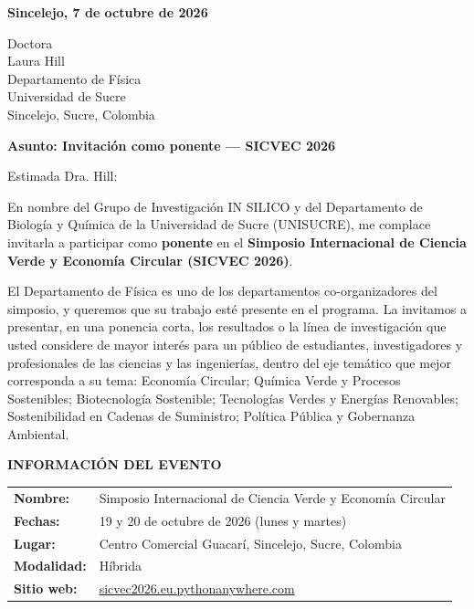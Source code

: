 \documentclass[11pt,a4paper]{article}
\begin{document}
\vspace{0.1cm}

\noindent
\textbf{Sincelejo, 7 de octubre de 2026}

\vspace{0.15cm}

\noindent
Doctora\\
Laura Hill\\
Departamento de Física\\
Universidad de Sucre\\
Sincelejo, Sucre, Colombia

\vspace{0.15cm}

\noindent
\textbf{\large Asunto: Invitación como ponente — SICVEC 2026}

\vspace{0.15cm}

Estimada Dra. Hill:

\vspace{0.1cm}

En nombre del Grupo de Investigación IN SILICO y del Departamento de Biología y Química de la Universidad de Sucre (UNISUCRE), me complace invitarla a participar como \textbf{ponente} en el \textbf{Simposio Internacional de Ciencia Verde y Economía Circular (SICVEC 2026)}.

El Departamento de Física es uno de los departamentos co-organizadores del simposio, y queremos que su trabajo esté presente en el programa. La invitamos a presentar, en una ponencia corta, los resultados o la línea de investigación que usted considere de mayor interés para un público de estudiantes, investigadores y profesionales de las ciencias y las ingenierías, dentro del eje temático que mejor corresponda a su tema: Economía Circular; Química Verde y Procesos Sostenibles; Biotecnología Sostenible; Tecnologías Verdes y Energías Renovables; Sostenibilidad en Cadenas de Suministro; Política Pública y Gobernanza Ambiental.

\vspace{0.1cm}

\noindent
\textbf{INFORMACIÓN DEL EVENTO}

\begin{tabular}{ll}
\textbf{Nombre:} & Simposio Internacional de Ciencia Verde y Economía Circular \\
\textbf{Fechas:} & 19 y 20 de octubre de 2026 (lunes y martes) \\
\textbf{Lugar:} & Centro Comercial Guacarí, Sincelejo, Sucre, Colombia \\
\textbf{Modalidad:} & Híbrida \\
\textbf{Sitio web:} & \href{https://sicvec2026.eu.pythonanywhere.com}{sicvec2026.eu.pythonanywhere.com} \\
\end{tabular}
\end{document}

